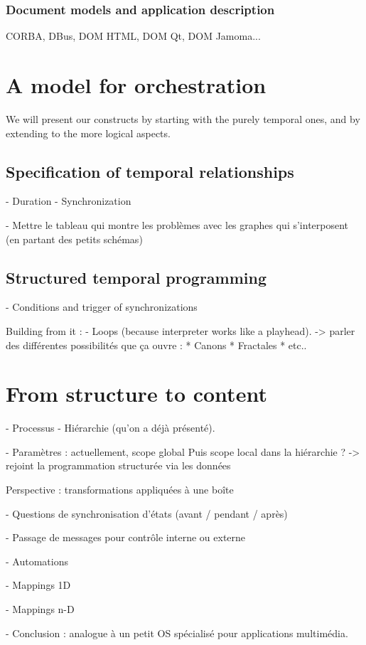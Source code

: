 \documentclass{sigchi}
\begin{document}
\subsubsection{Document models and application description} %
CORBA, DBus, DOM HTML, DOM Qt, DOM Jamoma...


\section{A model for orchestration}
We will present our constructs by starting with the purely temporal ones, 
and by extending to the more logical aspects.
\subsection{Specification of temporal relationships}
- Duration
- Synchronization

- Mettre le tableau qui montre les problèmes avec les graphes qui s'interposent (en partant des petits schémas)

\subsection{Structured temporal programming}
- Conditions and trigger of synchronizations

Building from it : 
- Loops (because interpreter works like a playhead).
-> parler des différentes possibilités que ça ouvre : 
* Canons
* Fractales
* etc..


\section{From structure to content}
- Processus
- Hiérarchie (qu'on a déjà présenté).

- Paramètres : actuellement, scope global
Puis scope local dans la hiérarchie ?
-> rejoint la programmation structurée via les données

Perspective : transformations appliquées à une boîte

- Questions de synchronisation d'états (avant / pendant / après)

- Passage de messages pour contrôle interne ou externe

- Automations  

- Mappings 1D

- Mappings n-D

- Conclusion : analogue à un petit OS spécialisé pour applications multimédia.
\end{document}
